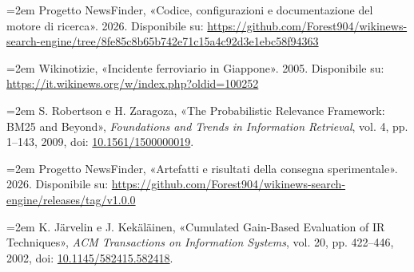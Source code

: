 \documentclass[11pt,a4paper]{article}
\newenvironment{CSLReferences}[2]{\begingroup\small\raggedright\renewcommand{\bibitem}[2][]{\par\hypertarget{##2}{}}\setlength{\parskip}{.55em}}{\endgroup}
\newcommand{\CSLLeftMargin}[1]{\hangindent=2em\noindent\makebox[2em][l]{#1}}
\newcommand{\CSLRightInline}[1]{#1}
\begin{document}
\protect{}\label{refs}
\begin{CSLReferences}{0}{0}
\bibitem[\citeproctext]{ref-repo}
\CSLLeftMargin{{[}1{]} }%
\CSLRightInline{Progetto NewsFinder, {«Codice, configurazioni e documentazione del motore di ricerca»}. 2026. Disponibile su: \url{https://github.com/Forest904/wikinews-search-engine/tree/8fe85c8b65b742e71c15a4c92d3e1ebc58f94363}}

\bibitem[\citeproctext]{ref-wiki}
\CSLLeftMargin{{[}2{]} }%
\CSLRightInline{Wikinotizie, {«Incidente ferroviario in Giappone»}. 2005. Disponibile su: \url{https://it.wikinews.org/w/index.php?oldid=100252}}

\bibitem[\citeproctext]{ref-bm25}
\CSLLeftMargin{{[}3{]} }%
\CSLRightInline{S. Robertson e H. Zaragoza, {«The Probabilistic Relevance Framework: BM25 and Beyond»}, \emph{Foundations and Trends in Information Retrieval}, vol. 4, pp. 1--143, 2009, doi: \href{https://doi.org/10.1561/1500000019}{10.1561/1500000019}.}

\bibitem[\citeproctext]{ref-esperimenti}
\CSLLeftMargin{{[}4{]} }%
\CSLRightInline{Progetto NewsFinder, {«Artefatti e risultati della consegna sperimentale»}. 2026. Disponibile su: \url{https://github.com/Forest904/wikinews-search-engine/releases/tag/v1.0.0}}

\bibitem[\citeproctext]{ref-dcg}
\CSLLeftMargin{{[}5{]} }%
\CSLRightInline{K. Järvelin e J. Kekäläinen, {«Cumulated Gain-Based Evaluation of IR Techniques»}, \emph{ACM Transactions on Information Systems}, vol. 20, pp. 422--446, 2002, doi: \href{https://doi.org/10.1145/582415.582418}{10.1145/582415.582418}.}

\end{CSLReferences}
\end{document}
